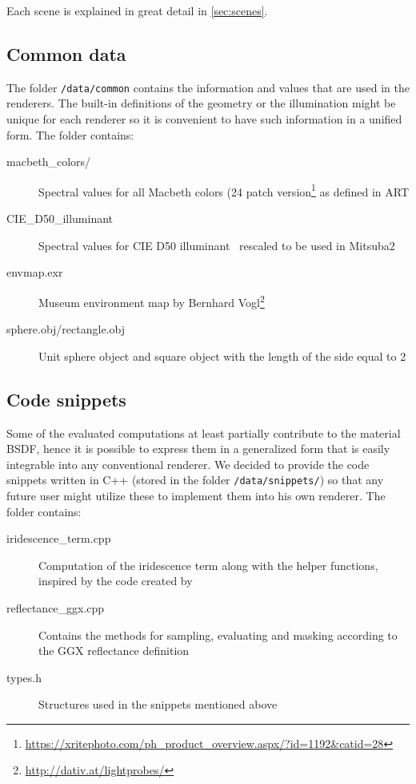 Each scene is explained in great detail in \autoref{sec:scenes}.

\subsection{Common data}

The folder \texttt{/data/common} contains the information and values that are used in the renderers. The built-in definitions of the geometry or the illumination might be unique for each renderer so it is convenient to have such information in a unified form. The folder contains:

\begin{description}
	\item[macbeth\_colors/] Spectral values for all Macbeth colors (24 patch version\footnote{\url{https://xritephoto.com/ph_product_overview.aspx/?id=1192&catid=28}} as defined in ART
	\item[CIE\_D50\_illuminant] Spectral values for CIE D50 illuminant~\cite{cieData} rescaled to be used in Mitsuba2
	\item[envmap.exr] Museum environment map by Bernhard Vogl\footnote{\url{http://dativ.at/lightprobes/}}
	\item[sphere.obj/rectangle.obj] Unit sphere object and square object with the length of the side equal to 2
\end{description}

\subsection{Code snippets}

Some of the evaluated computations at least partially contribute to the material BSDF, hence it is possible to express them in a generalized form that is easily integrable into any conventional renderer. We decided to provide the code snippets written in C++ (stored in the folder \texttt{/data/snippets/}) so that any future user might utilize these to implement them into his own renderer. The folder contains:

\begin{description}
	\item[iridescence\_term.cpp] Computation of the iridescence term along with the helper functions, inspired by the code created by \citet{belcour2017practical}
	\item[reflectance\_ggx.cpp] Contains the methods for sampling, evaluating and masking according to the GGX reflectance definition~\cite{walter2007microfacet}
	\item[types.h] Structures used in the snippets mentioned above 
\end{description}

